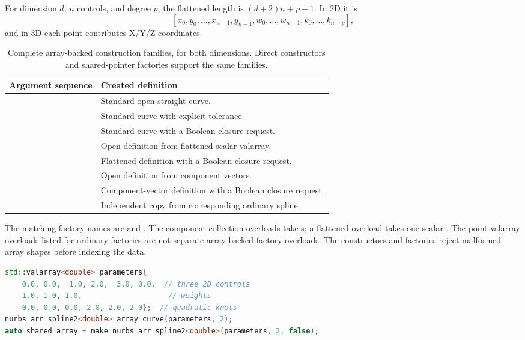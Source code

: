 For dimension $d$, $n$ controls, and degree $p$, the flattened length is
$(d+2)n+p+1$. In 2D it is
\[
 [x_0,y_0,\ldots,x_{n-1},y_{n-1},
   w_0,\ldots,w_{n-1},k_0,\ldots,k_{n+p}],
\]
and in 3D each point contributes X/Y/Z coordinates.

\begin{table}[htbp]
\centering
\caption{Complete array-backed construction families, for both dimensions.
Direct constructors and shared-pointer factories support the same families.}
\begin{tabularx}{\linewidth}{@{}p{.57\linewidth}Y@{}}
\toprule
Argument sequence & Created definition \\
\midrule
{} & Standard open straight curve. \\
 & Standard curve with explicit tolerance. \\
 & Standard curve with a Boolean closure request. \\
 & Open definition from flattened scalar valarray. \\
 & Flattened definition with a Boolean closure request. \\
 & Open definition from component vectors. \\
 & Component-vector definition with a Boolean closure request. \\
 & Independent copy from corresponding ordinary spline. \\
\bottomrule
\end{tabularx}
\end{table}

The matching factory names are  and
.
The component collection overloads take s; a flattened
overload takes one scalar . The point-valarray overloads
listed for ordinary factories are not separate array-backed factory
overloads. The constructors and factories reject malformed array shapes
before indexing the data.

\begin{lstlisting}[language=C++]
std::valarray<double> parameters{
    0.0, 0.0,  1.0, 2.0,  3.0, 0.0,  // three 2D controls
    1.0, 1.0, 1.0,                    // weights
    0.0, 0.0, 0.0, 2.0, 2.0, 2.0};  // quadratic knots
nurbs_arr_spline2<double> array_curve(parameters, 2);
auto shared_array = make_nurbs_arr_spline2<double>(parameters, 2, false);
\end{lstlisting}

